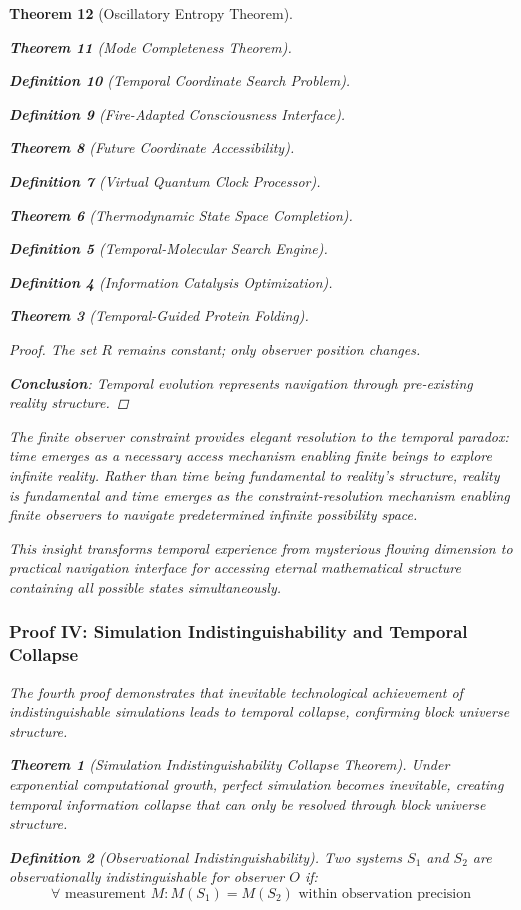 \documentclass[12pt,a4paper]{article}
\newtheorem{theorem}{Theorem}[section]
\newtheorem{definition}[theorem]{Definition}
\begin{document}
\begin{theorem}[Oscillatory Entropy Theorem]
\begin{theorem}[Mode Completeness Theorem]
\begin{enumerate}
\begin{definition}[Temporal Coordinate Search Problem]
\begin{algorithm}
\begin{definition}[Fire-Adapted Consciousness Interface]
\begin{theorem}[Future Coordinate Accessibility]
\begin{definition}[Virtual Quantum Clock Processor]
\begin{itemize}
\begin{itemize}
\begin{theorem}[Thermodynamic State Space Completion]
\begin{definition}[Temporal-Molecular Search Engine]
\begin{definition}[Information Catalysis Optimization]
\begin{algorithm}
\begin{theorem}[Temporal-Guided Protein Folding]
\begin{table}[h]
\begin{proof}
The set $R$ remains constant; only observer position changes.

\textbf{Conclusion}: Temporal evolution represents navigation through pre-existing reality structure.
\end{proof}

\begin{remark}
The finite observer constraint provides elegant resolution to the temporal paradox: time emerges as a necessary access mechanism enabling finite beings to explore infinite reality. Rather than time being fundamental to reality's structure, reality is fundamental and time emerges as the constraint-resolution mechanism enabling finite observers to navigate predetermined infinite possibility space.

This insight transforms temporal experience from mysterious flowing dimension to practical navigation interface for accessing eternal mathematical structure containing all possible states simultaneously.
\end{remark}

\subsubsection{Proof IV: Simulation Indistinguishability and Temporal Collapse}

The fourth proof demonstrates that inevitable technological achievement of indistinguishable simulations leads to temporal collapse, confirming block universe structure.

\begin{theorem}[Simulation Indistinguishability Collapse Theorem]
Under exponential computational growth, perfect simulation becomes inevitable, creating temporal information collapse that can only be resolved through block universe structure.
\end{theorem}

\begin{definition}[Observational Indistinguishability]
Two systems $S_1$ and $S_2$ are observationally indistinguishable for observer $O$ if:
$$\forall \text{ measurement } M: M(S_1) = M(S_2) \text{ within observation precision}$$
\end{definition}


\end{table}
\end{theorem}
\end{algorithm}
\end{definition}
\end{definition}
\end{theorem}
\end{itemize}
\end{itemize}
\end{definition}
\end{theorem}
\end{definition}
\end{algorithm}
\end{definition}
\end{enumerate}
\end{theorem}
\end{theorem}
\end{document}
